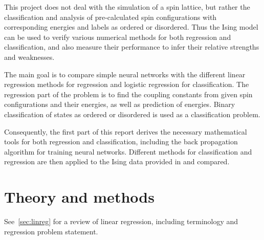 \documentclass[11pt,british,a4paper]{article}
\numberwithin{equation}{section}
\begin{document}
This project does not deal with the simulation of a spin lattice, but rather the classification and analysis of pre-calculated spin configurations with corresponding energies and labels as ordered or disordered.
Thus the Ising model can be used to verify various numerical methods for both regression and classification, and also measure their performance to infer their relative strengths and weaknesses.

The main goal is to compare simple neural networks with the different linear regression methods for regression and logistic regression for classification.
The regression part of the problem is to find the coupling constants from given spin configurations and their energies, as well as prediction of energies.
Binary classification of states as ordered or disordered is used as a classification problem.

Consequently, the first part of this report derives the necessary mathematical tools for both regression and classification, including the back propagation algorithm for training neural networks. Different methods for classification and regression are then applied to the Ising data provided in\cite{mehta} and compared.

\section{Theory and methods}
See~\vref{sec:linreg} for a review of linear regression, including terminology and regression problem statement.
\end{document}
